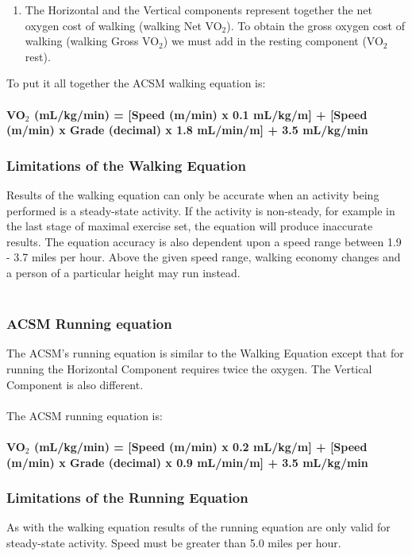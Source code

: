 \documentclass[12pt, a4paper]{report}   %
\begin{document}
\begin{enumerate}
\begin{enumerate}
	\item The Horizontal and the Vertical components represent together the net oxygen cost of walking (walking Net VO$_{2}$). To obtain the gross oxygen cost of walking (walking Gross VO$_{2}$) we must add in the resting component (VO$_{2}$rest).
\end{enumerate}
To put it all together the ACSM walking equation is:\\ \\
\textbf{VO$_{2}$ (mL/kg/min) = [Speed (m/min) x 0.1 mL/kg/m] +
          [Speed (m/min) x Grade (decimal) x 1.8 mL/min/m] +
          3.5 mL/kg/min}\\


\subsubsection{Limitations of the Walking Equation}
Results of the walking equation can only be accurate when an activity being performed is a steady-state activity. If the activity is non-steady, for example in the last stage of maximal exercise set, the equation will produce inaccurate results. The equation accuracy is also dependent upon a speed range between 1.9 - 3.7 miles per hour. Above the given speed range, walking economy changes and a person of a particular height may run instead.\\ \\


\clearpage
\subsubsection{ACSM Running equation}
The ACSM's running equation is similar to the Walking Equation except that for running the Horizontal Component requires twice the oxygen. The Vertical Component is also different.\\ \\
The ACSM running equation is:\\ \\
\textbf{VO$_{2}$ (mL/kg/min) = [Speed (m/min) x 0.2 mL/kg/m] +
          [Speed (m/min) x Grade (decimal) x 0.9 mL/min/m] +
          3.5 mL/kg/min}

\subsubsection{Limitations of the Running Equation}
As with the walking equation results of the running equation are only valid for steady-state activity. Speed must be greater than 5.0 miles per hour.\\


\end{enumerate}
\end{document}
